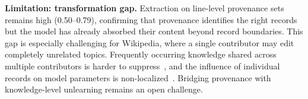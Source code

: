 \noindent\textbf{Limitation: transformation gap.} Extraction on line-level provenance sets remains high (0.50--0.79), confirming that provenance identifies the right records but the model has already absorbed their content beyond record boundaries. This gap is especially challenging for Wikipedia, where a single contributor may edit completely unrelated topics. Frequently occurring knowledge shared across multiple contributors is harder to suppress~\cite{krishnan2025notall}, and the influence of individual records on model parameters is non-localized~\cite{hammoudeh2024influence}. Bridging provenance with knowledge-level unlearning remains an open challenge.


